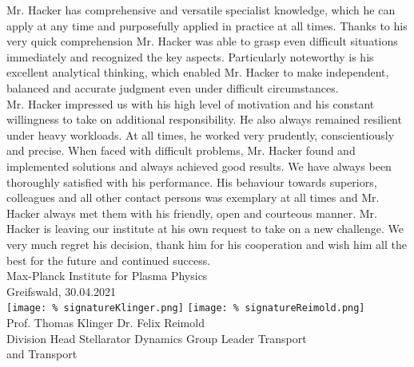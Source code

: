 \documentclass[
  fontsize=11pt,
  paper=a4,
  parskip=half,
  enlargefirstpage=on,    %
  fromalign=right,        %
  fromphone=on,           %
  fromemail=on,            
  fromrule=off,           %
  addrfield=off,          %
  backaddress=off,        %
  subject=beforeopening,  %
  locfield=narrow,        %
  foldmarks=off,          %
]{scrlttr2}
\begin{document}
\begin{letter}{}
  Mr. Hacker has comprehensive and versatile specialist knowledge, which he can apply at any time and purposefully applied in practice at all times. Thanks to his very quick comprehension Mr. Hacker was able to grasp even difficult situations immediately and recognized the key aspects. Particularly noteworthy is his excellent analytical thinking, which enabled Mr. Hacker to make independent, balanced and accurate judgment even under difficult circumstances.\\[0.4cm]%

  Mr. Hacker impressed us with his high level of motivation and his constant willingness to take on additional responsibility. He also always remained resilient under heavy workloads. At all times, he worked very prudently, conscientiously and precise. When faced with difficult problems, Mr. Hacker found and implemented solutions and always achieved good results. We have always been thoroughly satisfied with his performance. His behaviour towards superiors, colleagues and all other contact persons was exemplary at all times and Mr. Hacker always met them with his friendly, open and courteous manner. Mr. Hacker is leaving our institute at his own request to take on a new challenge. We very much regret his decision, thank him for his cooperation and wish him all the best for the future and continued success.\\[0.6cm]%

  Max-Planck Institute for Plasma Physics\\%
  Greifswald, 30.04.2021\\%
  \texttt{[image: \%
    signatureKlinger.png]}%
  \hfill%
  \texttt{[image: \%
    signatureReimold.png]}\\%
  Prof. Thomas Klinger\hfill%
  Dr. Felix Reimold\\%
  Division Head Stellarator Dynamics\hfill%
  Group Leader Transport\\
  and Transport%

\end{letter}
\end{document}
